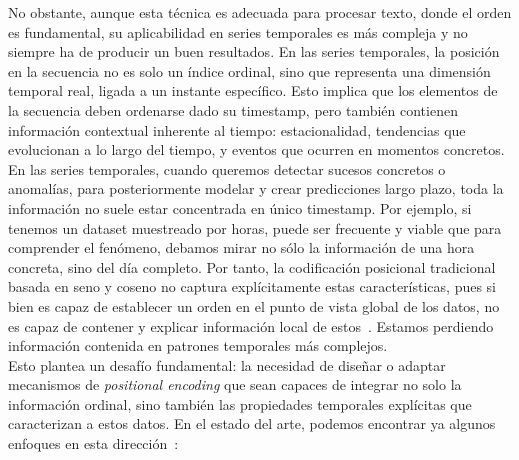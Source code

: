 No obstante, aunque esta técnica es adecuada para procesar texto, donde el orden es fundamental, su aplicabilidad en series temporales es más compleja y no siempre ha de producir un buen resultados. En las series temporales, la posición en la secuencia no es solo un índice ordinal, sino que representa una dimensión temporal real, ligada a un instante específico. Esto implica que los elementos de la secuencia deben ordenarse dado su timestamp, pero también contienen información contextual inherente al tiempo: estacionalidad, tendencias que evolucionan a lo largo del tiempo, y eventos que ocurren en momentos concretos.\\

En las series temporales, cuando queremos detectar sucesos concretos o anomalías, para posteriormente modelar y crear predicciones largo plazo, toda la información no suele estar concentrada en único timestamp. Por ejemplo, si tenemos un dataset muestreado por horas, puede ser frecuente y viable que para comprender el fenómeno, debamos mirar no sólo la información de una hora concreta, sino del día completo. Por tanto, la codificación posicional tradicional basada en seno y coseno no captura explícitamente estas características, pues si bien es capaz de establecer un orden en el punto de vista global de los datos, no es capaz de contener y explicar información local de estos~\cite{Foumani_2023,irani2025positionalencodingtransformerbasedtime}. Estamos perdiendo información contenida en patrones temporales más complejos.\\

Esto plantea un desafío fundamental: la necesidad de diseñar o adaptar mecanismos de \textit{positional encoding} que sean capaces de integrar no solo la información ordinal, sino también las propiedades temporales explícitas que caracterizan a estos datos. En el estado del arte, podemos encontrar ya algunos enfoques en esta dirección~\cite{irani2025positionalencodingtransformerbasedtime}:


